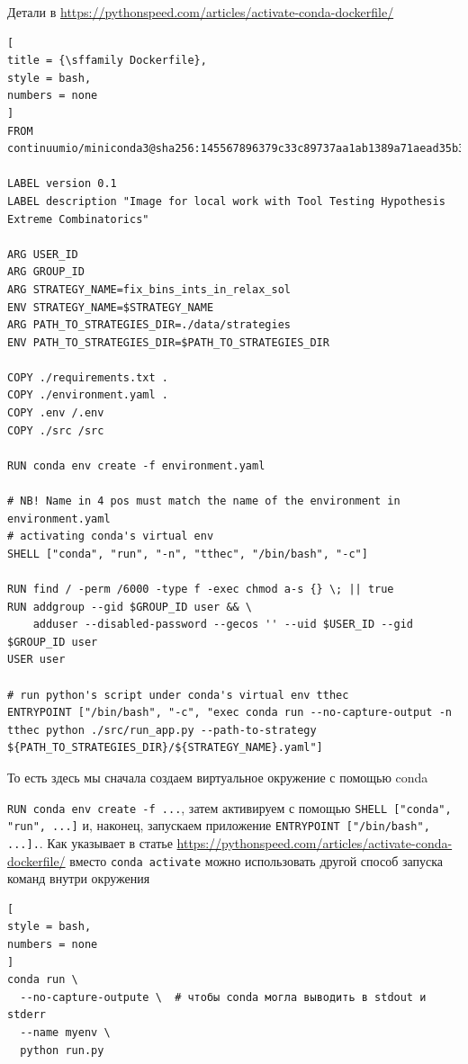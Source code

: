 \documentclass[%
	11pt,
	a4paper,
	utf8,
		]{article}
\begin{document}
Детали в \url{https://pythonspeed.com/articles/activate-conda-dockerfile/}
\begin{lstlisting}[
title = {\sffamily Dockerfile},
style = bash,
numbers = none
]
FROM continuumio/miniconda3@sha256:145567896379c33c89737aa1ab1389a71aead35b39f512118a13edcf9fe2a42c

LABEL version 0.1
LABEL description "Image for local work with Tool Testing Hypothesis Extreme Combinatorics"

ARG USER_ID
ARG GROUP_ID
ARG STRATEGY_NAME=fix_bins_ints_in_relax_sol
ENV STRATEGY_NAME=$STRATEGY_NAME
ARG PATH_TO_STRATEGIES_DIR=./data/strategies
ENV PATH_TO_STRATEGIES_DIR=$PATH_TO_STRATEGIES_DIR

COPY ./requirements.txt .
COPY ./environment.yaml .
COPY .env /.env
COPY ./src /src

RUN conda env create -f environment.yaml

# NB! Name in 4 pos must match the name of the environment in environment.yaml
# activating conda's virtual env
SHELL ["conda", "run", "-n", "tthec", "/bin/bash", "-c"]

RUN find / -perm /6000 -type f -exec chmod a-s {} \; || true
RUN addgroup --gid $GROUP_ID user && \
	adduser --disabled-password --gecos '' --uid $USER_ID --gid $GROUP_ID user
USER user

# run python's script under conda's virtual env tthec
ENTRYPOINT ["/bin/bash", "-c", "exec conda run --no-capture-output -n tthec python ./src/run_app.py --path-to-strategy ${PATH_TO_STRATEGIES_DIR}/${STRATEGY_NAME}.yaml"]
\end{lstlisting}

То есть здесь мы сначала создаем виртуальное окружение с помощью conda

\verb|RUN conda env create -f ...|, затем активируем с помощью \verb|SHELL ["conda", "run", ...]| и, наконец, запускаем приложение \verb|ENTRYPOINT ["/bin/bash", ...].|. Как указывает в статье \url{https://pythonspeed.com/articles/activate-conda-dockerfile/} вместо \verb|conda activate| можно использовать другой способ запуска команд внутри окружения
\begin{lstlisting}[
style = bash,
numbers = none
]
conda run \
  --no-capture-outpute \  # чтобы conda могла выводить в stdout и stderr
  --name myenv \
  python run.py
\end{lstlisting}
\end{document}
